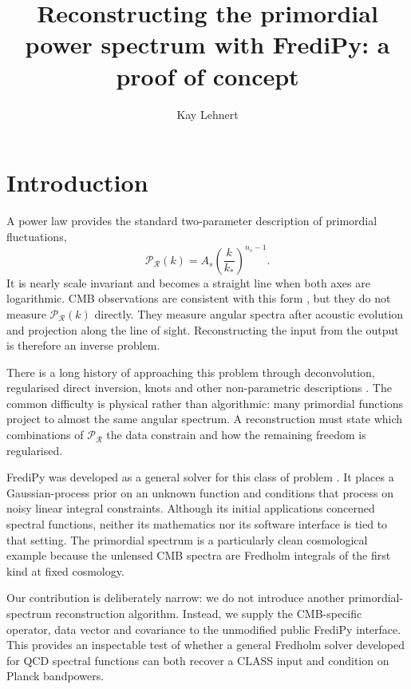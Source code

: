 \documentclass[11pt,a4paper]{article}
\title{Reconstructing the primordial power spectrum with FrediPy: a proof of concept}
\author{Kay Lehnert}
\affiliation{National University of Ireland, Maynooth}
\newcommand{\PR}{\mathcal P_{\mathcal R}}
\begin{document}
\maketitle
\flushbottom

\section{Introduction}
\label{sec:introduction}

A power law provides the standard two-parameter description of primordial
fluctuations,
\begin{equation}
  \PR(k)=A_s\left(\frac{k}{k_*}\right)^{n_s-1} .
  \label{eq:power-law}
\end{equation}
It is nearly scale invariant and becomes a straight line when both axes are
logarithmic.  CMB observations are consistent with this form
\citep{planck2018vi,planck2018x}, but they do not measure $\PR(k)$ directly.
They measure angular spectra after acoustic
evolution and projection along the line of sight.  Reconstructing the input
from the output is therefore an inverse problem.

There is a long history of approaching this problem through deconvolution,
regularised direct inversion, knots and other non-parametric descriptions
\citep{shafieloo2004,gauthier2012,hunt2014,sohn2022,raffaelli2025,chaki2025}.
The common difficulty is physical rather than algorithmic: many primordial
functions project to almost the same angular spectrum.  A reconstruction must
state which combinations of $\PR$ the data constrain and how the remaining
freedom is regularised.

FrediPy was developed as a general solver for this class of problem
\citep{fredipy,horak2022}.  It places a Gaussian-process prior on an unknown
function and conditions that process on noisy linear integral constraints.
Although its initial applications concerned spectral functions, neither its
mathematics nor its software interface is tied to that setting.  The primordial
spectrum is a particularly clean cosmological example because the unlensed CMB
spectra are Fredholm integrals of the first kind at fixed cosmology.

Our contribution is deliberately narrow: we do not introduce another
primordial-spectrum reconstruction algorithm.  Instead, we supply the
CMB-specific operator, data vector and covariance to the unmodified public
FrediPy interface.  This provides an inspectable test of whether a general
Fredholm solver developed for QCD spectral functions can both recover a CLASS
input and condition on Planck bandpowers.
\end{document}

